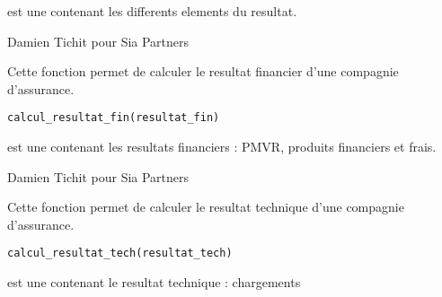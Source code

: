 \documentclass[a4paper]{book}
\begin{document}
%
\begin{Arguments}
\begin{ldescription}
\item[\code{resultat}] est une  contenant les differents elements du resultat.
\end{ldescription}
\end{Arguments}
%
\begin{Author}\relax
Damien Tichit pour Sia Partners
\end{Author}
%
\begin{Description}\relax
Cette fonction permet de calculer le resultat financier d'une compagnie d'assurance.
\end{Description}
%
\begin{Usage}
\begin{verbatim}
calcul_resultat_fin(resultat_fin)
\end{verbatim}
\end{Usage}
%
\begin{Arguments}
\begin{ldescription}
\item[\code{resultat\_fin}] est une  contenant les resultats financiers : PMVR, produits financiers et frais.
\end{ldescription}
\end{Arguments}
%
\begin{Author}\relax
Damien Tichit pour Sia Partners
\end{Author}
%
\begin{Description}\relax
Cette fonction permet de calculer le resultat technique d'une compagnie d'assurance.
\end{Description}
%
\begin{Usage}
\begin{verbatim}
calcul_resultat_tech(resultat_tech)
\end{verbatim}
\end{Usage}
%
\begin{Arguments}
\begin{ldescription}
\item[\code{resultat\_tech}] est une  contenant le resultat technique : chargements
\end{ldescription}
\end{Arguments}
\end{document}
